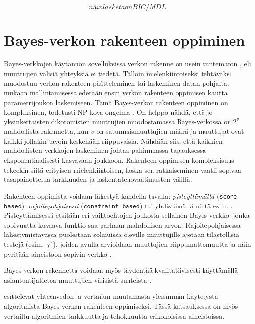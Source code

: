 $$
    näin lasketaan BIC / MDL
$$

\section{Bayes-verkon rakenteen oppiminen}
Bayes-verkkojen käytännön sovelluksissa verkon rakenne on usein tuntematon \citep{ruggeri_bayesian_2008}, eli muuttujien välisiä yhteyksiä ei tiedetä. Tällöin mielenkiintoiseksi tehtäväksi muodostuu verkon rakenteen päätteleminen tai laskeminen datan pohjalta. \citet{myllymaki_bayes-verkkojen_1998} mukaan mallintamisessa edetään ensin verkon rakenteen oppimisen kautta parametrijoukon laskemiseen. Tämä Bayes-verkon rakenteen oppiminen on kompleksinen, todetusti NP-kova ongelma \citep{chickering_large-sample_2004}. On helppo nähdä, että jo yksinkertaisten dikotomisten muuttujien muodostamassa Bayes-verkossa on $2^v$ mahdollista rakennetta, kun $v$ on satunnaismuuttujien määrä ja muuttujat ovat kaikki jollakin tavoin keskenään riippuvaisia. Nähdään siis, että kaikkien mahdollisten verkkojen laskeminen johtaa pahimmassa tapauksessa eksponentiaalisesti kasvavaan joukkoon. Rakenteen oppimisen kompleksisuus tekeekin siitä erityisen mielenkiintoisen, koska sen ratkaiseminen vaatii sopivaa tasapainottelua tarkkuuden ja laskentatehovaatimusten välillä.

Rakenteen oppimista voidaan lähestyä kahdella tavalla: \emph{pisteyttämällä} (\texttt{score based}),  \emph{rajoitepohjaisesti} (\texttt{constraint based}) \citep{ramsahai_connecting_2020, scutari_learning_2010} tai yhdistämällä näitä esim. \citep{li_hybrid_2018}. Pisteyttämisessä etsitään eri vaihtoehtojen joukosta sellainen Bayes-verkko, jonka sopivuutta kuvaava funktio saa parhaan mahdollisen arvon. Rajoitepohjaisessa lähestymistavassa puolestaan solmuissa oleville muuttujille ajetaan tilastollisia testejä (esim. $\chi^2$), joiden avulla arvioidaan muuttujien riippumattomuutta ja näin pyritään aineistoon sopivin verkko \citep{ramsahai_connecting_2020, scutari_learning_2010}. 

Bayes-verkon rakennetta voidaan myös täydentää kvalitatiivisesti käyttämällä asiantuntijatietoa muuttujien välisistä suhteista \citep{ruggeri_bayesian_2008, myllymaki_bayes-verkkojen_1998}. 

\citet{mittal_review_2011} esittelevät yhteenvedon ja vertailun muutamasta yleisimmin käytetystä algoritmista Bayes-verkon rakenteen oppimiseksi. Tässä katsauksessa on myös vertailtu algoritmien tarkkuutta ja tehokkuutta erikokoisissa aineistoissa.

